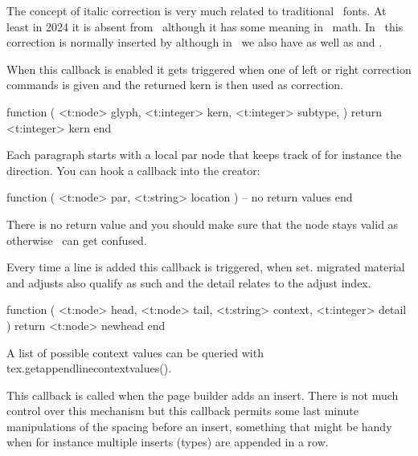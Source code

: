 The concept of italic correction is very much related to traditional \TEX\ fonts.
At least in 2024 it is absent from \OPENTYPE\ although it has some meaning in
\OPENTYPE\ math. In \TEX\ this correction is normally inserted by \type {\/}
although in \LUAMETATEX\ we also have \typ {\explicititaliccorrection} as well as
\typ {\forcedleftcorrection} and \typ {\forcedrightcorrection}.

When this callback is enabled it gets triggered when one of left or right
correction commands is given and the returned kern is then used as correction.

\starttyping[option=LUA]
function (
    <t:node>    glyph,
    <t:integer> kern,
    <t:integer> subtype,
)
    return <t:integer> kern
end
\stoptyping

\stopsubsection

\startsubsection[title=insert_par]

Each paragraph starts with a local par node that keeps track of for instance
the direction. You can hook a callback into the creator:

\starttyping[option=LUA]
function (
    <t:node>   par,
    <t:string> location
)
    -- no return values
end
\stoptyping

There is no return value and you should make sure that the node stays valid
as otherwise \TEX\ can get confused.

\stopsubsection

\startsubsection[title=append_line_filter]

Every time a line is added this callback is triggered, when set. migrated
material and adjusts also qualify as such and the detail relates to the adjust
index.

\starttyping[option=LUA]
function (
    <t:node>    head,
    <t:node>    tail,
    <t:string>  context,
    <t:integer> detail
)
    return <t:node> newhead
end
\stoptyping

A list of possible context values can be queried with \typ
{tex.getappendlinecontextvalues()}.

\stopsubsection

\startsubsection[title=insert_distance]

This callback is called when the page builder adds an insert. There is not much
control over this mechanism but this callback permits some last minute
manipulations of the spacing before an insert, something that might be handy when
for instance multiple inserts (types) are appended in a row.

